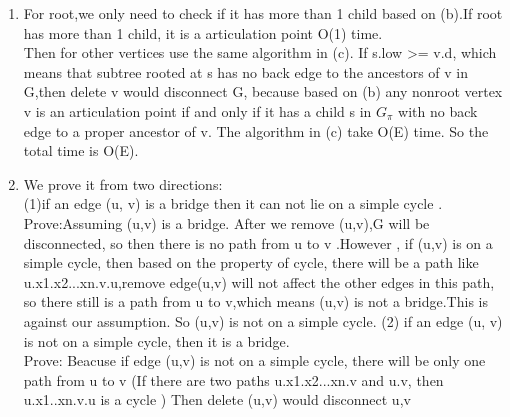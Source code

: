 \documentclass[paper=a4, fontsize=11pt]{scrartcl} %
\numberwithin{equation}{section} %
\numberwithin{figure}{section} %
\numberwithin{table}{section} %
\begin{document}
\begin{enumerate}[label={2.(\alph*)}]
  \item 
For root,we only need to check if it has more than 1 child based on (b).If root has more than 1 child, it is a articulation point
O(1) time.\\
Then for other vertices  use the same algorithm in (c). If s.low >= v.d, which means that subtree rooted at s has no back edge to  the ancestors of v in G,then delete v would disconnect G, because based on (b)  any nonroot vertex v is an articulation point if and only if it has a child s in  ${G_\pi}$ with no back edge to a proper ancestor of v. The algorithm in (c) take O(E) time.
So the total time is O(E).

  \item 
We prove it from two directions:\\
(1)if an edge (u, v) is a bridge then it can not lie on a simple cycle .\\
Prove:Assuming (u,v) is a bridge. After we  remove (u,v),G  will be disconnected, so  then there is no path from u to v .However , if (u,v) is on a simple cycle, then based on the property of cycle, there will be a path like u.x1.x2...xn.v.u,remove edge(u,v) will not affect the other edges in this path, so there still is a path from u to v,which means (u,v) is not a bridge.This is against our assumption. So (u,v) is not on a simple cycle.  
(2) if an edge (u, v) is not on a simple cycle, then it is a bridge.\\
Prove: Beacuse if edge (u,v) is not on a simple cycle, there will be only one path from u to v (If there are two paths u.x1.x2...xn.v and  u.v, then u.x1..xn.v.u is a cycle ) Then delete (u,v) would disconnect u,v 



\end{enumerate}
\end{document}
